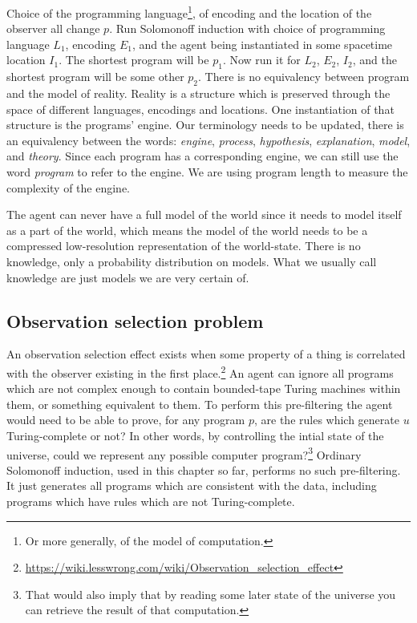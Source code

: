 Choice of the programming language\footnote{Or more generally, of the model of computation.}, of encoding and the location of the observer all change $p$.
Run Solomonoff induction with choice of programming language $L_1$, encoding $E_1$, and the agent being instantiated in some spacetime location $I_1$.
The shortest program will be $p_1$.
Now run it for $L_2$, $E_2$, $I_2$, and the shortest program will be some other $p_2$.
There is no equivalency between program and the model of reality.
Reality is a structure which is preserved through the space of different languages, encodings and locations.
One instantiation of that structure is the programs' engine.
Our terminology needs to be updated, there is an equivalency between the words: \textit{engine}, \textit{process}, \textit{hypothesis}, \textit{explanation}, \textit{model}, and \textit{theory}.
Since each program has a corresponding engine, we can still use the word \textit{program} to refer to the engine.
We are using program length to measure the complexity of the engine.

The agent can never have a full model of the world since it needs to model itself as a part of the world, which means the model of the world needs to be a compressed low-resolution representation of the world-state.
There is no knowledge, only a probability distribution on models.
What we usually call knowledge are just models we are very certain of.

\newpage

\subsection{Observation selection problem}

An observation selection effect exists when some property of a thing is correlated with the observer existing in the first place.\footnote{\url{https://wiki.lesswrong.com/wiki/Observation_selection_effect}}
An agent can ignore all programs which are not complex enough to contain bounded-tape Turing machines within them, or something equivalent to them.
To perform this pre-filtering the agent would need to be able to prove, for any program $p$, are the rules which generate $u$ Turing-complete or not?
In other words, by controlling the intial state of the universe, could we represent any possible computer program?\footnote{That would also imply that by reading some later state of the universe you can retrieve the result of that computation.}
Ordinary Solomonoff induction, used in this chapter so far, performs no such pre-filtering.
It just generates all programs which are consistent with the data, including programs which have rules which are not Turing-complete.

